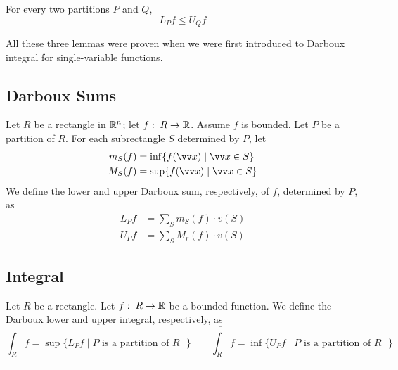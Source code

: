 \begin{lemma}
For every two partitions $P$ and $Q$,
$$
L_P f \leq U_Q f
$$
\end{lemma}

All these three lemmas were proven when we were first introduced to Darboux integral for single-variable functions.

\subsection{Darboux Sums}
\begin{definition}
Let $R$ be a rectangle in ${\mathbb R}^n$; let $f:\; R \to {\mathbb R}$. Assume $f$ is bounded. Let $P$ be a partition of $R$. For each subrectangle $S$ determined by $P$, let
$$
\begin{aligned}
m_S(f) &= \inf\{f(\vv x) \mid \vv x \in S\} \\
M_S(f) &= \sup\{f(\vv x) \mid \vv x \in S\}
\end{aligned}
$$
We define the lower and upper Darboux sum, respectively, of $f$, determined by $P$, as
$$
\begin{aligned}
L_P f &= \sum_S m_S(f) \cdot v(S) \\
U_P f &= \sum_S M_r(f) \cdot v(S)
\end{aligned}
$$
\end{definition}

\subsection{Integral}

\begin{definition}
Let $R$ be a rectangle. Let $f:\; R \to {\mathbb R}$ be a bounded function. We define the Darboux lower and upper integral, respectively, as
$$
\underline{\int_R}f = \sup \{ L_P f \mid \text{$P$ is a partition of $R$ }\} \qquad
\overline{\int_R}f = \inf \{ U_P f \mid \text{$P$ is a partition of $R$ }\}
$$
\end{definition}

\begin{center}
\end{center}

